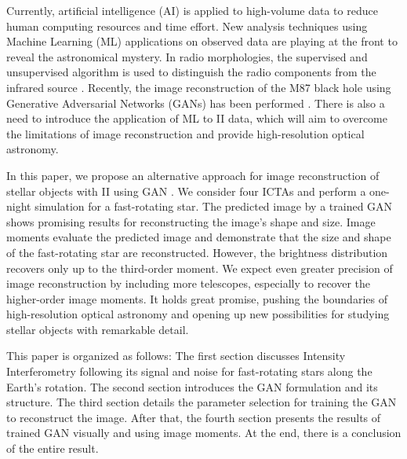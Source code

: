 Currently, artificial intelligence (AI) is applied to high-volume data to reduce human computing resources and time effort. New analysis techniques using Machine Learning (ML) applications on observed data are playing at the front to reveal the astronomical mystery. In radio morphologies, the supervised and unsupervised algorithm is used to distinguish the radio components from the infrared source \citep{wu2019radio, galvin2020cataloguing}. Recently, the image reconstruction of the M87 black hole using Generative Adversarial Networks (GANs) has been performed \citep{10.1093/mnras/stad3797}. There is also a need to introduce the application of ML to II data, which will aim to overcome the limitations of image reconstruction and provide high-resolution optical astronomy. 

In this paper, we propose an alternative approach for image reconstruction of stellar objects with II using GAN \citep{goodfellow2014generative}. We consider four ICTAs and perform a one-night simulation for a fast-rotating star. The predicted image by a trained GAN shows promising results for reconstructing the image's shape and size. Image moments evaluate the predicted image and demonstrate that the size and shape of the fast-rotating star are reconstructed. However, the brightness distribution recovers only up to the third-order moment. We expect even greater precision of image reconstruction by including more telescopes, especially to recover the higher-order image moments. It holds great promise, pushing the boundaries of high-resolution optical astronomy and opening up new possibilities for studying stellar objects with remarkable detail.

This paper is organized as follows: The first section discusses Intensity Interferometry following its signal and noise for fast-rotating stars along the Earth's rotation. The second section introduces the GAN formulation and its structure. The third section details the parameter selection for training the GAN to reconstruct the image. After that, the fourth section presents the results of trained GAN visually and using image moments. At the end, there is a conclusion of the entire result.